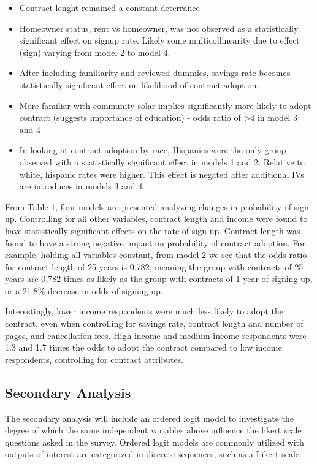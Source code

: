 \documentclass[
]{article}
\providecommand{\tightlist}{%
  \setlength{\itemsep}{0pt}\setlength{\parskip}{0pt}}
\begin{document}
\begin{itemize}
\tightlist
\item
  Contract lenght remained a constant deterrance
\item
  Homeowner status, rent vs homeowner, was not observed as a
  statistically significant effect on signup rate. Likely some
  multicollinearity due to effect (sign) varying from model 2 to model
  4.
\item
  After including familiarity and reviewed dummies, savings rate becomes
  statistically significant effect on likelihood of contract adoption.
\item
  More familiar with community solar implies significantly more likely
  to adopt contract (suggests importance of education) - odds ratio of
  \textgreater4 in model 3 and 4
\item
  In looking at contract adoption by race, Hispanics were the only group
  observed with a statistically significant effect in models 1 and 2.
  Relative to white, hispanic rates were higher. This effect is negated
  after additional IVs are introduces in models 3 and 4.
\end{itemize}

From Table 1, four models are presented analyzing changes in probability
of sign up. Controlling for all other variables, contract length and
income were found to have statistically significant effects on the rate
of sign up. Contract length was found to have a strong negative impact
on probability of contract adoption. For example, holding all variables
constant, from model 2 we see that the odds ratio for contract length of
25 years is 0.782, meaning the group with contracts of 25 years are
0.782 times as likely as the group with contracts of 1 year of signing
up, or a 21.8\% decrease in odds of signing up.

Interestingly, lower income respondents were much less likely to adopt
the contract, even when controlling for savings rate, contract length
and number of pages, and cancellation fees. High income and medium
income respondents were 1.3 and 1.7 times the odds to adopt the contract
compared to low income respondents, controlling for contract attributes.

\hypertarget{secondary-analysis}{%
\subsection{Secondary Analysis}\label{secondary-analysis}}

The secondary analysis will include an ordered logit model to
investigate the degree of which the same independent variables above
influence the likert scale questions asked in the survey. Ordered logit
models are commonly utilized with outputs of interest are categorized in
discrete sequences, such as a Likert scale.
\end{document}
